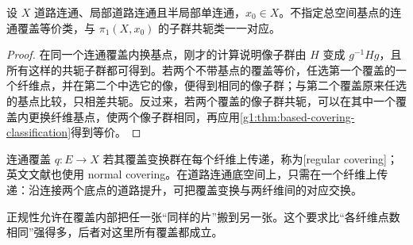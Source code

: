 \begin{proposition}\label{g1:prop:unbased-covering-classification}
	设 \(X\) 道路连通、局部道路连通且半局部单连通，\(x_0\in X\)。不指定总空间基点的连通覆盖等价类，与 \(\pi_1(X,x_0)\) 的子群共轭类一一对应。
\end{proposition}
\begin{proof}
	在同一个连通覆盖内换基点，刚才的计算说明像子群由 \(H\) 变成 \(g^{-1}Hg\)，且所有这样的共轭子群都可得到。若两个不带基点的覆盖等价，任选第一个覆盖的一个纤维点，并在第二个中选它的像，便得到相同的像子群；与第二个覆盖原来任选的基点比较，只相差共轭。反过来，若两个覆盖的像子群共轭，可以在其中一个覆盖内更换纤维基点，使两个像子群相同，再应用\cref{g1:thm:based-covering-classification}得到等价。
\end{proof}

\begin{definition}\label{g1:def:normal-covering}
	连通覆盖 \(q:E\to X\) 若其覆盖变换群在每个纤维上传递，称为[regular covering]；英文文献也使用 normal covering。在道路连通底空间上，只需在一个纤维上传递：沿连接两个底点的道路提升，可把覆盖变换与两纤维间的对应交换。
\end{definition}

正规性允许在覆盖内部把任一张“同样的片”搬到另一张。这个要求比“各纤维点数相同”强得多，后者对这里所有覆盖都成立。

